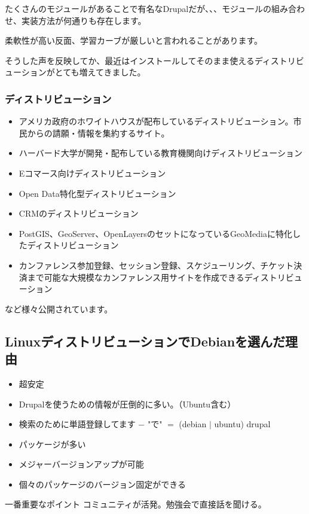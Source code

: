 \documentclass[mingoth,a4paper]{jsarticle}
\begin{document}
たくさんのモジュールがあることで有名なDrupalだが、、、モジュールの組み合わせ、実装方法が何通りも存在します。

柔軟性が高い反面、学習カーブが厳しいと言われることがあります。

そうした声を反映してか、最近はインストールしてそのまま使えるディストリビューションがとても増えてきました。

\subsubsection{ディストリビューション}

\begin{itemize}
\item アメリカ政府のホワイトハウスが配布しているディストリビューション。市民からの請願・情報を集約するサイト。
\item ハーバード大学が開発・配布している教育機関向けディストリビューション
\item Eコマース向けディストリビューション
\item Open Data特化型ディストリビューション
\item CRMのディストリビューション
\item PostGIS、GeoServer、OpenLayersのセットになっているGeoMediaに特化したディストリビューション
\item カンファレンス参加登録、セッション登録、スケジューリング、チケット決済まで可能な大規模なカンファレンス用サイトを作成できるディストリビューション
\end{itemize}

など様々公開されています。
\cite{distributions}


\subsection{LinuxディストリビューションでDebianを選んだ理由}
\begin{itemize}
\item 超安定
\item Drupalを使うための情報が圧倒的に多い。（Ubuntu含む）
\item 検索のために単語登録してます $-$ "で" $=$ (debian $|$ ubuntu) drupal
\item パッケージが多い
\item メジャーバージョンアップが可能
\item 個々のパッケージのバージョン固定ができる
\end{itemize}

\begin{itembox}[l]{一番重要なポイント}
 コミュニティが活発。勉強会で直接話を聞ける。
\end{itembox}
\end{document}
